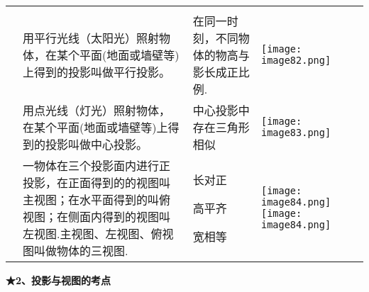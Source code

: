 \begin{longtable}[]{@{}llll@{}}
\toprule
\endhead
& & &\tabularnewline
&
用平行光线（太阳光）照射物体，在某个平面(地面或墙壁等)上得到的投影叫做平行投影。
& 在同一时刻，不同物体的物高与影长成正比例. &
\texttt{[image: image82.png]}\tabularnewline
&
用点光线（灯光）照射物体，在某个平面(地面或墙壁等)上得到的投影叫做中心投影。
& 中心投影中存在三角形相似 &
\texttt{[image: image83.png]}\tabularnewline
\begin{minipage}[t]{0.22\columnwidth}\raggedright
\strut
\end{minipage} & \begin{minipage}[t]{0.22\columnwidth}\raggedright
一物体在三个投影面内进行正投影，在正面得到的的视图叫主视图；在水平面得到的叫俯视图；在侧面内得到的视图叫左视图.主视图、左视图、俯视图叫做物体的三视图.\strut
\end{minipage} & \begin{minipage}[t]{0.22\columnwidth}\raggedright
长对正

高平齐

宽相等\strut
\end{minipage} & \begin{minipage}[t]{0.22\columnwidth}\raggedright
\texttt{[image: image84.png]}\texttt{[image: image84.png]}\strut
\end{minipage}\tabularnewline
\bottomrule
\end{longtable}

\textbf{★2、投影与视图的考点}

